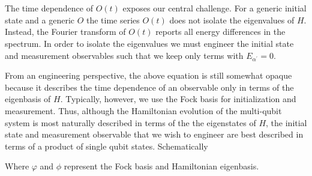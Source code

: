 \noindent The time dependence of $O(t)$ exposes our central challenge.
For a generic initial state and a generic $\hat{O}$ the time series $O(t)$ does not isolate the eigenvalues of $H$.
Instead, the Fourier transform of $O(t)$ reports all energy differences in the spectrum.
In order to isolate the eigenvalues we must engineer the initial state and measurement observables such that we keep only terms with $E_{\alpha^{\prime}}=0$.

From an engineering perspective,
the above equation is still somewhat opaque because it describes the time dependence of an observable only in terms of the eigenbasis of $H$.
Typically, however, we use the Fock basis for initialization and measurement.
Thus, although the Hamiltonian evolution of the multi-qubit system is most naturally described in terms of the the eigenstates of $H$,
the initial state and measurement observable that we wish to engineer are best described in terms of a product of single qubit states.
Schematically
\begin{center}
\end{center}
Where $\varphi$ and $\phi$ represent the Fock basis and Hamiltonian eigenbasis.

